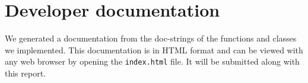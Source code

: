 \chapter{Developer documentation}
We generated a documentation from the doc-strings of the functions and classes we implemented. This documentation is in HTML format and can be viewed with any web browser by opening the \texttt{index.html} file. It will be submitted along with this report.

